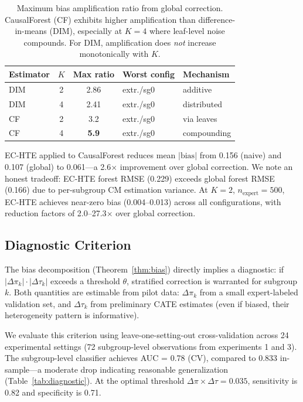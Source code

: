 \documentclass[11pt]{article}
\newcommand{\dpi}{\Delta\pi}
\newcommand{\dtau}{\Delta\tau}
\begin{document}
\begin{table}[t]
\centering
\small
\begin{tabular}{lccll}
\toprule
Estimator & $K$ & Max ratio & Worst config & Mechanism \\
\midrule
DIM & 2 & 2.86 & extr./sg0 & additive \\
DIM & 4 & 2.41 & extr./sg0 & distributed \\
CF & 2 & 3.2 & extr./sg0 & via leaves \\
CF & 4 & \textbf{5.9} & extr./sg0 & compounding \\
\bottomrule
\end{tabular}
\caption{Maximum bias amplification ratio from global correction. CausalForest (CF) exhibits higher amplification than difference-in-means (DIM), especially at $K{=}4$ where leaf-level noise compounds. For DIM, amplification does \emph{not} increase monotonically with $K$.}
\label{tab:cf_hurts}
\end{table}

EC-HTE applied to CausalForest reduces mean $|\text{bias}|$ from 0.156 (naive) and 0.107 (global) to 0.061---a 2.6$\times$ improvement over global correction.
We note an honest tradeoff: EC-HTE forest RMSE (0.229) exceeds global forest RMSE (0.166) due to per-subgroup CM estimation variance.
At $K{=}2$, $n_{\text{expert}}{=}500$, EC-HTE achieves near-zero bias (0.004--0.013) across all configurations, with reduction factors of 2.0--27.3$\times$ over global correction.

\subsection{Diagnostic Criterion}
\label{sec:diagnostic}

The bias decomposition (Theorem~\ref{thm:bias}) directly implies a diagnostic: if $|\dpi_k| \cdot |\dtau_k|$ exceeds a threshold $\theta$, stratified correction is warranted for subgroup $k$.
Both quantities are estimable from pilot data: $\dpi_k$ from a small expert-labeled validation set, and $\dtau_k$ from preliminary CATE estimates (even if biased, their heterogeneity pattern is informative).

We evaluate this criterion using leave-one-setting-out cross-validation across 24 experimental settings (72 subgroup-level observations from experiments 1 and 3).
The subgroup-level classifier achieves AUC = 0.78 (CV), compared to 0.833 in-sample---a moderate drop indicating reasonable generalization (Table~\ref{tab:diagnostic}).
At the optimal threshold $\dpi \times \dtau = 0.035$, sensitivity is 0.82 and specificity is 0.71.
\end{document}
